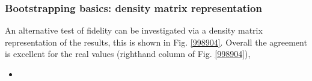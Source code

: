 \subsubsection{Bootstrapping basics: density matrix representation}

An alternative test of fidelity can be investigated via a density matrix representation of the results, this is shown in Fig. \ref{998904}. Overall the agreement is excellent for the real values (righthand column of Fig. \ref{998904}), 

\begin{itemize}
\item 
\end{itemize}